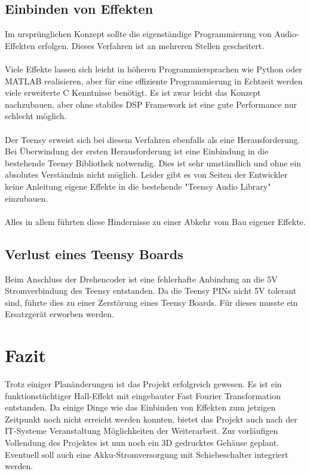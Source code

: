 \documentclass[12pt]{article}
\begin{document}
\subsection{Einbinden von Effekten}
Im ursprünglichen Konzept sollte die eigenständige Programmierung von Audio-Effekten erfolgen. 
Dieses Verfahren ist an mehreren Stellen gescheitert. 
\\
\\
Viele Effekte lassen sich leicht in höheren Programmiersprachen
wie Python oder MATLAB realisieren, aber für eine effiziente Programmierung in Echtzeit werden viele erweiterte C Kenntnisse benötigt. 
Es ist zwar leicht das Konzept nachzubauen, aber ohne stabiles DSP Framework ist eine gute 
Performance nur schlecht möglich. 
\\
\\
Der Teensy erweist sich bei diesem Verfahren ebenfalls als eine Herausforderung. Bei Überwindung der ersten Herausforderung 
ist eine Einbindung in die bestehende Teensy Bibliothek notwendig. Dies ist sehr umständlich und ohne ein absolutes Verständnis nicht möglich. 
Leider gibt es von Seiten der Entwickler keine Anleitung eigene Effekte in die bestehende "Teensy Audio Library" einzubauen. 
\\
\\
Alles in allem führten diese Hindernisse zu einer Abkehr vom Bau eigener Effekte.  
\subsection{Verlust eines Teensy Boards}
Beim Anschluss der Drehencoder ist eine fehlerhafte Anbindung an die 5V Stromverbindung des Teensy entstanden. 
Da die Teensy PINs nicht 5V tolerant sind, führte dies zu einer Zerstörung eines Teensy Boards.
Für dieses musste ein Ersatzgerät erworben werden. 

  
\section{Fazit}
Trotz einiger Planänderungen ist das Projekt erfolgreich gewesen. Es ist ein funktionstüchtiger Hall-Effekt mit eingebauter Fast Fourier Transformation
entstanden.
Da einige Dinge wie das Einbinden von Effekten zum jetzigen Zeitpunkt noch nicht erreicht werden konnten, bietet das Projekt auch nach der IT-Systeme 
Veranstaltung Möglichkeiten der Weiterarbeit. Zur vorläufigen Vollendung des Projektes ist nun noch ein 3D gedrucktes Gehäuse geplant. 
Eventuell soll auch eine Akku-Stromversorgung mit Schiebeschalter integriert werden.
\newpage
\end{document}
